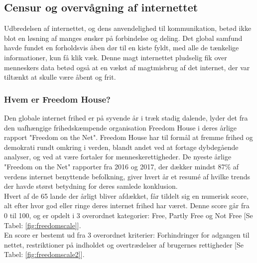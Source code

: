 \subsection{Censur og overvågning af internettet}
Udbredelsen af internettet, og dens anvendelighed til kommunikation, betød ikke blot en løsning af manges ønsker på forbindelse og deling. Det global samfund havde fundet en forholdsvis åben dør til en kiste fyldt, med alle de tænkelige informationer, kun få klik væk. Denne magt internettet pludselig fik over menneskers data betød også at en vækst af magtmisbrug af det internet, der var tiltænkt at skulle være åbent og frit.
\subsubsection{Hvem er Freedom House?}
Den globale internet frihed er på syvende år i træk stadig dalende\cite{FreedomHouseRapport2017}, lyder det fra den uafhængige frihedskæmpende organisation Freedom House i deres årlige rapport "Freedom on the Net". Freedom House har til formål at fremme frihed og demokrati rundt omkring i verden, blandt andet ved at fortage dybdegående analyser, og ved at være fortaler for menneskerettigheder.\cite{FreedomHouseAbout} De nyeste årlige "Freedom on the Net" rapporter fra 2016 og 2017, der dækker mindst 87\% af verdens internet benyttende befolkning, giver hvert år et resumé af hvilke trends der havde størst betydning for deres samlede konklusion. \\
\noindent
Hvert af de 65 lande der årligt bliver afdækket, får tildelt sig en numerisk score, alt efter hvor god eller ringe deres internet frihed har været. Denne score går fra 0 til 100, og er opdelt i 3 overordnet kategorier: Free, Partly Free og Not Free [Se Tabel: \ref{fig:freedomscale}].\\ 
En score er bestemt ud fra 3 overordnet kriterier: Forhindringer for adgangen til nettet, restriktioner på indholdet og overtrædelser af brugernes rettigheder [Se Tabel: \ref{fig:freedomscale2}].\cite{FreedomHouseRapportMethodology}
\\
